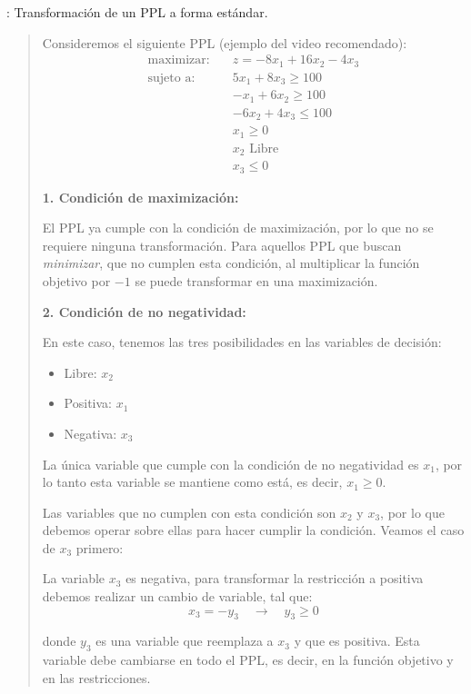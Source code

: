 \ejemplo\label{ej:transformacion_ppl_forma_estandar}: Transformación de un PPL a forma estándar.
\begin{quote}
  Consideremos el siguiente PPL (ejemplo del video recomendado):
  \begin{align*}
    \text{maximizar:} \quad   &z = -8x_1 + 16x_2 - 4x_3 \\[3pt]
    \text{sujeto a:} \quad    &5x_1 + 8x_3 \geq 100 \\
                              &-x_1 + 6x_2 \geq 100 \\
                              &-6x_2 + 4x_3 \leq 100 \\
                              &x_1 \geq 0 \\
                              &x_2 \text{ Libre} \\
                              &x_3 \leq0
  \end{align*}

  \noindent\textbf{1. Condición de maximización:}

  El PPL ya cumple con la condición de maximización, por lo que no se requiere ninguna transformación. Para aquellos PPL que buscan \textit{minimizar}, que no cumplen esta condición, al multiplicar la función objetivo por \(-1\) se puede transformar en una maximización. 

  \noindent\textbf{2. Condición de no negatividad:}

  En este caso, tenemos las tres posibilidades en las variables de decisión:
  \begin{itemize}
    \item Libre: \(x_2\)
    \item Positiva: \(x_1\)
    \item Negativa: \(x_3\)
  \end{itemize}

  La única variable que cumple con la condición de no negatividad es \(x_1\), por lo tanto esta variable se mantiene como está, es decir, \(x_1 \geq 0\). 

  Las variables que no cumplen con esta condición son \(x_2\) y \(x_3\), por lo que debemos operar sobre ellas para hacer cumplir la condición. Veamos el caso de \(x_3\) primero: 

  La variable \(x_3\) es negativa, para transformar la restricción a positiva debemos realizar un cambio de variable, tal que:
  \[
    x_3 = -y_3 \quad \rightarrow \quad y_3 \geq 0
  \]

  \noindent donde \(y_3\) es una variable que reemplaza a \(x_3\) y que es positiva. Esta variable debe cambiarse en todo el PPL, es decir, en la función objetivo y en las restricciones. 


\end{quote}
